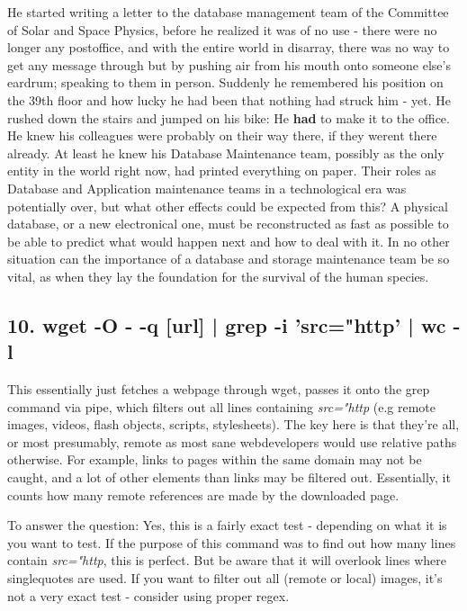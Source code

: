 He started writing a letter to the database management team of the Committee of Solar and Space Physics, before he realized it was of no use - there were no longer any postoffice, and with the entire world in disarray, there was no way to get any message through but by pushing air from his mouth onto someone else's eardrum; speaking to them in person. Suddenly he remembered his position on the 39th floor and how lucky he had been that nothing had struck him - yet. He rushed down the stairs and jumped on his bike: He \textbf{had} to make it to the office. He knew his colleagues were probably on their way there, if they werent there already. At least he knew his Database Maintenance team, possibly as the only entity in the world right now, had printed everything on paper. Their roles as Database and Application maintenance teams in a technological era was potentially over, but what other effects could be expected from this? A physical database, or a new electronical one, must be reconstructed as fast as possible to be able to predict what would happen next and how to deal with it. In no other situation can the importance of a database and storage maintenance team be so vital, as when they lay the foundation for the survival of the human species. 

\subsection{10. wget -O - -q [url] | grep -i 'src="http' | wc -l}
This essentially just fetches a webpage through wget, passes it onto the grep command via pipe, which filters out all lines containing \textit{src="http} (e.g remote images, videos, flash objects, scripts, stylesheets). The key here is that they're all, or most presumably, remote as most sane webdevelopers would use relative paths otherwise. For example, links to pages within the same domain may not be caught, and a lot of other elements than links may be filtered out. Essentially, it counts how many remote references are made by the downloaded page.

To answer the question: Yes, this is a fairly exact test - depending on what it is you want to test. If the purpose of this command was to find out how many lines contain \textit{src="http}, this is perfect. But be aware that it will overlook lines where singlequotes are used. If you want to filter out all (remote or local) images, it's not a very exact test - consider using proper regex.